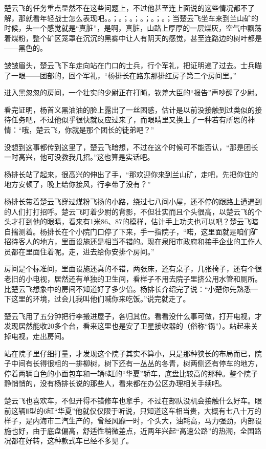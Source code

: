 楚云飞的任务重点显然不在这些问题上，不过他甚至连上面说的这些情况都不了解，那就看年轻战士怎么表现吧。。；。；。；。；。；。；当楚云飞坐车来到兰山矿的时候，头一个感觉就是“真脏”，是啊，真脏，山路上厚厚的一层煤灰，空气中飘荡着煤粉，整个矿区笼罩在沉沉的黑雾中让人有阴天的感觉，甚至连路边的树叶都是——黑色的。

皱皱眉头，楚云飞下车走向站在门口的士兵，行个军礼，把证明递了过去。士兵瞄了一眼——团部的，回个军礼，“杨排长在路东那排红房子第二个房间里。”

进入黑忽忽的房间，一个壮实的少尉正在打盹，钦差大臣的“报告”声吵醒了少尉。

看完证明，杨首义黑油油的脸上露出了一丝困惑，估计是以前没接触到过类似的接待任务吧，不过他似乎很快就反应过来了，而眼睛里又换上了一种若有所思的神情：“哦，楚云飞，你就是那个团长的徒弟吧？”

没想到这事都传到这里了，楚云飞暗想，不过在这个时候可不能否认，“那是团长一时高兴，他可没教我几招。”这也算是实话吧。

杨排长站了起来，很高兴的伸出了手，“那欢迎你来到兰山矿，走吧，先把你住的地方安顿了，晚上给你接风，行李带了没有？”

杨排长带着楚云飞穿过煤粉飞扬的小路，绕过七八间小屋，还不停的跟路上遭遇到的人们打打招呼。楚云飞盯着少尉的背影，不但壮实而且个头很高，以楚云飞的个头才打到他的眼睛，看来有1米86、87的模样，估计手上功夫也可以吧？楚云飞暗自揣测着。杨排长在个小院门口停了下来，手一指院子，“喏，这里面就是咱们矿招待客人的地方，里面设施还是相当不错的。现在泉阳市政府和接手企业的工作人员都在里面住着呢。走，进去给你安排个房间。”

房间是个标准间，里面设施还真的不错，两张床，还有桌子，几张椅子，还有个很老旧的小电视，居然还有单独的卫生间，看样子不用去院子里挤公用水管和厕所。比楚云飞想象中的房间不知道好了多少倍。杨排长介绍完了说：“小楚你先熟悉一下这里的环境，过会儿我叫他们喊你来吃饭。”说完就走了。

楚云飞用了五分钟把行李搬进屋子，各归其位。看看没什么事可做，打开电视，才发现居然能收20多个台，看来这里也是安了卫星接收器的（俗称“锅”）。站起来关掉电视，走出房间。

站在院子里仔细打量，才发现这个院子其实不算小，只是那种狭长的布局而已，院子中间有长得很粗的一排柳树，树下还有一丛丛的冬青，树两侧还有停车的地方，停着两辆白色的小面包车和一辆6缸的“华夏”轿车，底盘比较高的那种。整个院子静悄悄的，没有杨排长说的那些人，看来都在办公区办理相关手续吧。

楚云飞也喜欢车，不但开得不错修车也拿手，不过在部队没机会接触什么好车。眼前这辆Ⅱ型的6缸“华夏”他就仅仅限于听说，只知道这车相当贵，大概有七八十万的样子，是内海市二汽生产的，曾经风靡一时，个头大，油耗高，马力强劲，内部设施也好，由于底盘偏高，舒适性稍微差点，近两年兴起“高速公路”的热潮，全国路况都在好转，这种款式车已经不多见了。

